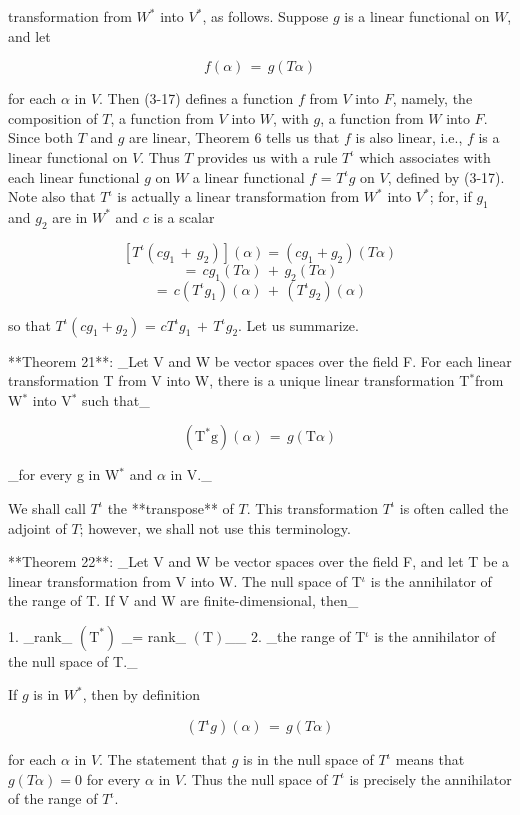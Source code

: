 transformation from \(W^{*}\) into \(V^{*}\), as follows. Suppose \(g\) is a linear functional on \(W\), and let

\[f(\alpha)\,=\,g(T\alpha)\]

for each \(\alpha\) in \(V\). Then (3-17) defines a function \(f\) from \(V\) into \(F\), namely, the composition of \(T\), a function from \(V\) into \(W\), with \(g\), a function from \(W\) into \(F\). Since both \(T\) and \(g\) are linear, Theorem 6 tells us that \(f\) is also linear, i.e., \(f\) is a linear functional on \(V\). Thus \(T\) provides us with a rule \(T^{\iota}\) which associates with each linear functional \(g\) on \(W\) a linear functional \(f\) = \(T^{\iota}g\) on \(V\), defined by (3-17). Note also that \(T^{\iota}\) is actually a linear transformation from \(W^{*}\) into \(V^{*}\); for, if \(g_{1}\) and \(g_{2}\) are in \(W^{*}\) and \(c\) is a scalar

\[[T^{\iota}(cg_{1}\,+\,g_{2})](\alpha) = (cg_{1}+g_{2})(T\alpha)\] \[= \,cg_{1}(T\alpha)\,+\,g_{2}(T\alpha)\] \[= \,c(T^{\iota}g_{1})(\alpha)\,+\,(T^{\iota}g_{2})(\alpha)\]

so that \(T^{\iota}(cg_{1}+g_{2})\) = \(cT^{\iota}g_{1}\,+\,T^{\iota}g_{2}\). Let us summarize.

**Theorem 21**: _Let V and W be vector spaces over the field F. For each linear transformation T from V into W, there is a unique linear transformation T\({}^{*}\)from W\({}^{*}\) into V\({}^{*}\) such that_

\[(\mathrm{T^{*}g})(\alpha)\,=\,g(\mathrm{T}\alpha)\]

_for every g in W\({}^{*}\) and \(\alpha\) in V._

We shall call \(T^{\iota}\) the **transpose** of \(T\). This transformation \(T^{\iota}\) is often called the adjoint of \(T\); however, we shall not use this terminology.

**Theorem 22**: _Let V and W be vector spaces over the field F, and let T be a linear transformation from V into W. The null space of T\({}^{\iota}\) is the annihilator of the range of T. If V and W are finite-dimensional, then_

1. _rank_ \((\mathrm{T^{*}})\) _= rank_ \((\mathrm{T})\)__
2. _the range of T\({}^{\iota}\) is the annihilator of the null space of T._

If \(g\) is in \(W^{*}\), then by definition

\[(T^{\iota}g)(\alpha)\,=\,g(T\alpha)\]

for each \(\alpha\) in \(V\). The statement that \(g\) is in the null space of \(T^{\iota}\) means that \(g(T\alpha)=0\) for every \(\alpha\) in \(V\). Thus the null space of \(T^{\iota}\) is precisely the annihilator of the range of \(T^{\iota}\).

